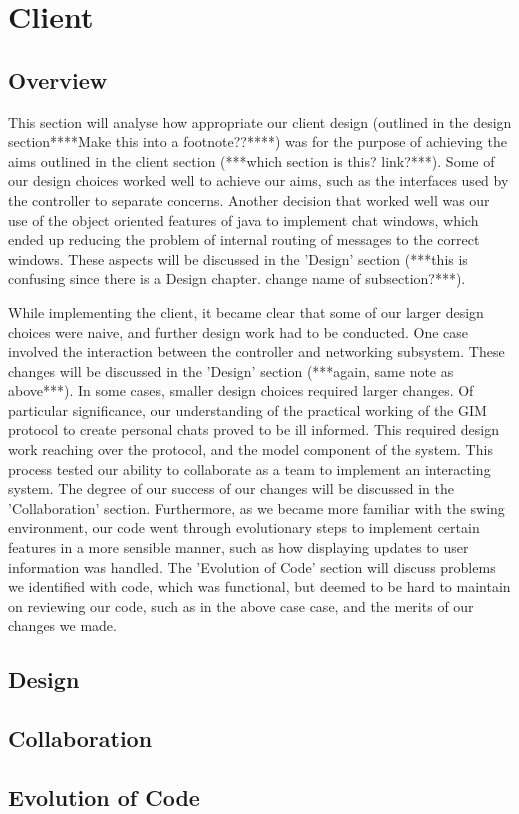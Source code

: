 \section{Client}

\subsection{Overview}

This section will analyse how appropriate our client design (outlined in the design section****Make this into a footnote??****) was for the purpose of achieving the aims outlined in the client section (***which section is this? link?***). Some of our design choices worked well to achieve our aims, such as the interfaces used by the controller to separate concerns. Another decision that worked well was our use of the object oriented features of java to implement chat windows, which ended up reducing the problem of internal routing of messages to the correct windows. These aspects will be discussed in the 'Design' section (***this is confusing since there is a Design chapter. change name of subsection?***).

While implementing the client, it became clear that some of our larger design choices were naive, and further design work had to be conducted. One case involved the interaction between the controller and networking subsystem. These changes will be discussed in the 'Design' section (***again, same note as above***). In some cases, smaller design choices required larger changes. Of particular significance, our understanding of the practical working of the GIM protocol to create personal chats proved to be ill informed. This required design work reaching over the protocol, and the model component of the system. This process tested our ability to collaborate as a team to implement an interacting system. The degree of our success of our changes will be discussed in the 'Collaboration' section. Furthermore, as we became more familiar with the swing environment, our code went through evolutionary steps to implement certain features in a more sensible manner, such as how displaying updates to user information was handled. The 'Evolution of Code' section will discuss problems we identified with code, which was functional,  but deemed to be hard to maintain on reviewing our code, such as in the above case case, and the merits of our changes we made. 

\subsection{Design}

\subsection{Collaboration}

\subsection{Evolution of Code}
